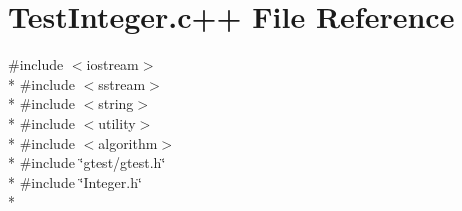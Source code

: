 \hypertarget{_test_integer_8c_09_09}{\section{Test\-Integer.\-c++ File Reference}
\label{_test_integer_8c_09_09}
}
{\ttfamily \#include $<$iostream$>$}\\*
{\ttfamily \#include $<$sstream$>$}\\*
{\ttfamily \#include $<$string$>$}\\*
{\ttfamily \#include $<$utility$>$}\\*
{\ttfamily \#include $<$algorithm$>$}\\*
{\ttfamily \#include \char`\"{}gtest/gtest.\-h\char`\"{}}\\*
{\ttfamily \#include \char`\"{}Integer.\-h\char`\"{}}\\*
